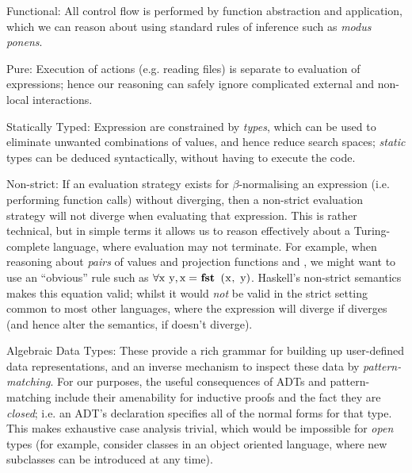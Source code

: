 \documentclass[]{article}
\begin{document}
\begin{description}

\item{Functional}: All control flow is performed by function abstraction and application, which we can reason about using standard rules of inference such as \emph{modus ponens}.

\item{Pure}: Execution of actions (e.g. reading files) is separate to evaluation of expressions; hence our reasoning can safely ignore complicated external and non-local interactions.

\item{Statically Typed}: Expression are constrained by \emph{types}, which can be used to eliminate unwanted combinations of values, and hence reduce search spaces; \emph{static} types can be deduced syntactically, without having to execute the code.

\item{Non-strict}: If an evaluation strategy exists for $\beta$-normalising an expression (i.e. performing function calls) without diverging, then a non-strict evaluation strategy will not diverge when evaluating that expression. This is rather technical, but in simple terms it allows us to reason effectively about a Turing-complete language, where evaluation may not terminate. For example, when reasoning about \emph{pairs} of values  and projection functions  and , we might want to use an ``obvious'' rule such as $\forall \text{\hs{x y}}, \text{\hs{x}} = \text{\hs{fst (x, y)}}$. Haskell's non-strict semantics makes this equation valid; whilst it would \emph{not} be valid in the strict setting common to most other languages, where the expression  will diverge if  diverges (and hence alter the semantics, if  doesn't diverge).

\item{Algebraic Data Types}: These provide a rich grammar for building up user-defined data representations, and an inverse mechanism to inspect these data by \emph{pattern-matching}. For our purposes, the useful consequences of ADTs and pattern-matching include their amenability for inductive proofs and the fact they are \emph{closed}; i.e. an ADT's declaration specifies all of the normal forms for that type. This makes exhaustive case analysis trivial, which would be impossible for \emph{open} types (for example, consider classes in an object oriented language, where new subclasses can be introduced at any time).


\end{description}
\end{document}
